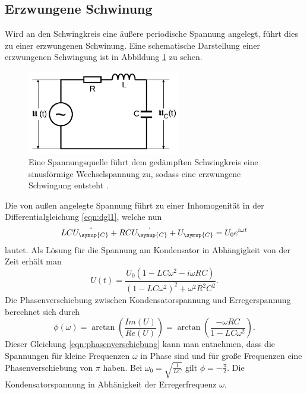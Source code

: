 \subsection{Erzwungene Schwinung}
Wird an den Schwingkreis eine äußere periodische Spannung angelegt, führt dies zu
einer erzwungenen Schwinung. Eine schematische Darstellung einer erzwungenen
Schwingung ist in Abbildung \ref{fig:erz_schwingung} zu sehen.
\begin{figure}
  \centering
  \includegraphics[width=0.6\textwidth]{erzwungene_schwingung.png}
  \caption{Eine Spannungsquelle führt dem gedämpften Schwingkreis eine sinusförmige
  Wechselspannung zu, sodass eine erzwungene Schwingung entsteht \cite{sample}.}
  \label{fig:erz_schwingung}
\end{figure}
Die von außen angelegte Spannung führt zu einer Inhomogenität in der Differentialgleichung
\eqref{eqn:dgl1}, welche nun
\begin{equation}
  L C \ddot{U_\symup{C}} + R C \dot{U_\symup{C}} + U_\symup{C} = U_0 e^{i\omega t}
  \label{eqn:dgl2}
\end{equation}
lautet. Als Lösung für die Spannung am Kondensator in Abhängigkeit von der Zeit
erhält man
\begin{equation}
  U(t) = \frac{U_0 (1 - L C \omega^2 - i \omega R C)}{(1 - L C \omega^2)^2 +
  \omega^2 R^2 C^2}.
  \label{eqn:loesung2}
\end{equation}
Die Phasenverschiebung zwischen Kondensatorspannung und Erregerspannung berechnet
sich durch
\begin{equation}
  \phi(\omega)=\arctan\left({\frac{Im(U)}{Re(U)}}\right)
  = \arctan\left({\frac{-\omega R C}{1-L C \omega^2}}\right).
  \label{eqn:phasenverschiebung}
\end{equation}
Dieser Gleichung \eqref{eqn:phasenverschiebung} kann man entnehmen, dass die
Spannungen für kleine Frequenzen $\omega$ in Phase sind und für große Frequenzen
eine Phasenverschiebung von $\pi$ haben. Bei $\omega_0=\sqrt{\frac{1}{L C}}$ gilt
$\phi = -\frac{\pi}{2}$.\newline
Die Kondensatorspannung in Abhänigkeit der Erregerfrequenz $\omega$,
